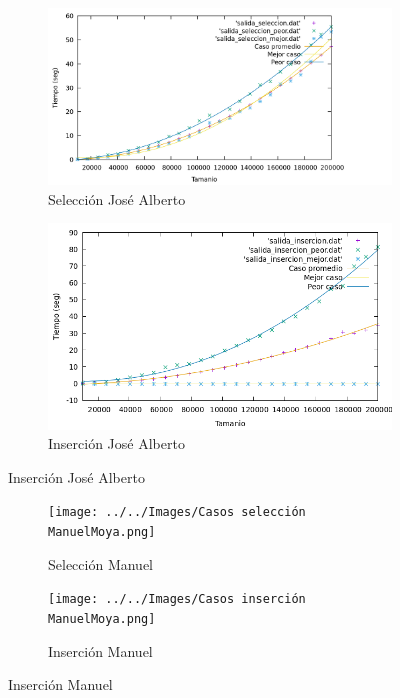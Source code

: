 \documentclass[10pt,a4paper]{article}
\begin{document}
\newpage

\begin{figure}[h!]
	\begin{subfigure}{.5\textwidth}
		\centering
		\includegraphics[scale=0.12]{../../Images/Gráfica casos selección Joshoccas.png}
		\caption{Selección José Alberto}
	\end{subfigure}
	\hfill
	\begin{subfigure}{.5\textwidth}
		\centering
		\includegraphics[scale=0.3]{../../Images/Gráfica casos inserción Joshoccas.png}
		\caption{Inserción José Alberto}
	\end{subfigure}
\end{figure}

\begin{figure}[h!]
	\begin{subfigure}{.5\textwidth}
		\centering
		\texttt{[image: ../../Images/Casos selección ManuelMoya.png]}
		\caption{Selección Manuel}
	\end{subfigure}
	\hfill
	\begin{subfigure}{.5\textwidth}
		\centering
		\texttt{[image: ../../Images/Casos inserción ManuelMoya.png]}
		\caption{Inserción Manuel}
	\end{subfigure}
\end{figure}
\end{document}
